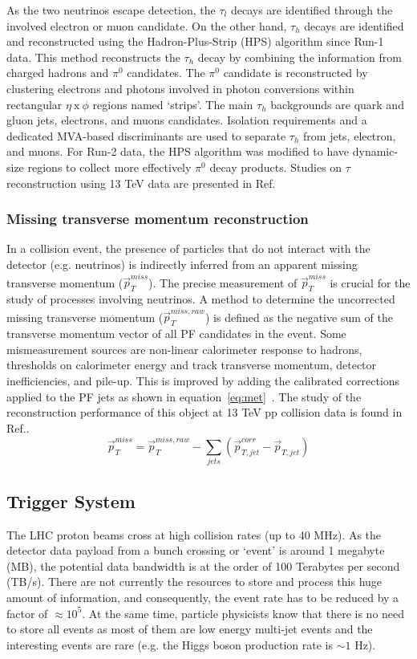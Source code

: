 As the two neutrinos escape detection, the $\tau_{l}$ decays are identified through the involved electron or muon candidate. On the other hand, $\tau_{h}$ decays are identified and reconstructed using the Hadron-Plus-Strip (HPS) algorithm since Run-1 data. This method reconstructs the $\tau_{h}$ decay by combining the information from charged hadrons and $\pi^{0}$ candidates. The $\pi^{0}$ candidate is reconstructed by clustering electrons and photons involved in photon conversions within rectangular $\eta~\mathrm{x}~\phi$ regions named `strips'. The main $\tau_{h}$ backgrounds are quark and gluon jets, electrons, and muons candidates. Isolation requirements and a dedicated MVA-based discriminants are used to separate $\tau_{h}$ from jets, electron, and muons. For Run-2 data, the HPS algorithm was modified to have dynamic-size regions to collect more effectively $\pi^{0}$ decay products. Studies on $\tau$ reconstruction using 13 TeV data are presented in Ref.~\cite{cmstau13tev}

\subsubsection{Missing transverse momentum reconstruction}
In a collision event, the presence of particles that do not interact with the detector (e.g. neutrinos) is indirectly inferred from an apparent missing transverse momentum ($\vec{p}_{T}^{miss}$). The precise measurement of $\vec{p}_{T}^{miss}$ is crucial for the study of processes involving neutrinos. A method to determine the uncorrected missing transverse momentum ($\vec{p}_{T}^{miss,raw}$) is defined as the negative sum of the transverse momentum vector of all PF candidates in the event. Some mismeasurement sources are non-linear calorimeter response to hadrons, thresholds on calorimeter energy and track transverse momentum, detector inefficiencies, and pile-up. This is improved by adding the calibrated corrections applied to the PF jets as shown in equation~\ref{eq:met}~\cite{cmspfalgo}. The study of the reconstruction performance of this object at 13 TeV pp collision data is found in Ref.\cite{cmsmet13tev}.
\begin{equation}
\vec{p}_{T}^{miss} = \vec{p}_{T}^{miss,raw} - \sum_{jets} (\vec{p}_{T,jet}^{corr} - \vec{p}_{T,jet}) 
\label{eq:met}
\end{equation}

\subsection{Trigger System}
The LHC proton beams cross at high collision rates (up to 40 MHz). As the detector data payload from a bunch crossing or `event' is around 1 megabyte (MB), the potential data bandwidth is at the order of 100 Terabytes per second (TB/s). There are not currently the resources to store and process this huge amount of information, and consequently, the event rate has to be reduced by a factor of $\approx10^{5}$. At the same time, particle physicists know that there is no need to store all events as most of them are low energy multi-jet events and the interesting events are rare (e.g. the Higgs boson production rate is $\sim1$ Hz).

